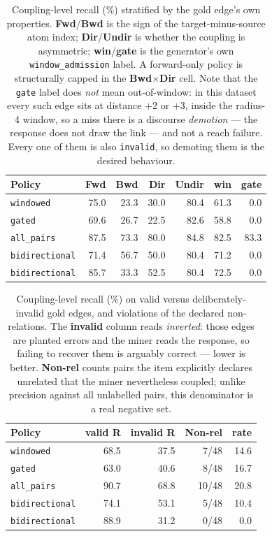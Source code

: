 \documentclass[11pt]{article}
\begin{document}
\begin{table}[htbp]
\centering
\small
\caption{Coupling-level recall (\%) stratified by the gold edge's own properties. \textbf{Fwd}/\textbf{Bwd} is the sign of the target-minus-source atom index; \textbf{Dir}/\textbf{Undir} is whether the coupling is asymmetric; \textbf{win}/\textbf{gate} is the generator's own \texttt{window\_admission} label. A forward-only policy is structurally capped in the \textbf{Bwd}$\times$\textbf{Dir} cell. Note that the \texttt{gate} label does \emph{not} mean out-of-window: in this dataset every such edge sits at distance $+2$ or $+3$, inside the radius-4 window, so a miss there is a discourse \emph{demotion} --- the response does not draw the link --- and not a reach failure. Every one of them is also \texttt{invalid}, so demoting them is the desired behaviour.}
\label{tab:mining-recall-strat}
\begin{tabular}{lrrrrrr}
\toprule
Policy & Fwd & Bwd & Dir & Undir & win & gate \\
\midrule
\texttt{windowed} & 75.0 & 23.3 & 30.0 & 80.4 & 61.3 & 0.0 \\
\texttt{gated} & 69.6 & 26.7 & 22.5 & 82.6 & 58.8 & 0.0 \\
\texttt{all\_pairs} & 87.5 & 73.3 & 80.0 & 84.8 & 82.5 & 83.3 \\
\texttt{bidirectional} & 71.4 & 56.7 & 50.0 & 80.4 & 71.2 & 0.0 \\
\texttt{bidirectional} & 85.7 & 33.3 & 52.5 & 80.4 & 72.5 & 0.0 \\
\bottomrule
\end{tabular}
\end{table}

\begin{table}[htbp]
\centering
\small
\caption{Coupling-level recall (\%) on valid versus deliberately-invalid gold edges, and violations of the declared non-relations. The \textbf{invalid} column reads \emph{inverted}: those edges are planted errors and the miner reads the response, so failing to recover them is arguably correct --- lower is better. \textbf{Non-rel} counts pairs the item explicitly declares unrelated that the miner nevertheless coupled; unlike precision against all unlabelled pairs, this denominator is a real negative set.}
\label{tab:mining-validity}
\begin{tabular}{lrrrr}
\toprule
Policy & valid R & invalid R & Non-rel & rate \\
\midrule
\texttt{windowed} & 68.5 & 37.5 & 7/48 & 14.6 \\
\texttt{gated} & 63.0 & 40.6 & 8/48 & 16.7 \\
\texttt{all\_pairs} & 90.7 & 68.8 & 10/48 & 20.8 \\
\texttt{bidirectional} & 74.1 & 53.1 & 5/48 & 10.4 \\
\texttt{bidirectional} & 88.9 & 31.2 & 0/48 & 0.0 \\
\bottomrule
\end{tabular}
\end{table}
\end{document}
